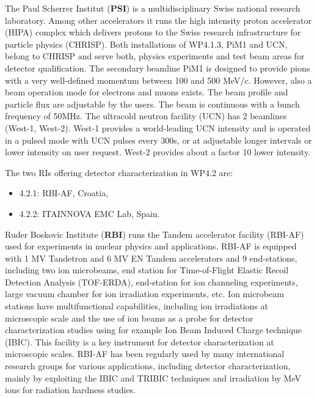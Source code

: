 The Paul Scherrer Institut (\textbf{PSI}) is a multidisciplinary Swiss national research laboratory. Among other accelerators it runs the high intensity proton accelerator (HIPA) complex which delivers protons to the Swiss research infrastructure for particle physics (CHRISP). Both installations of WP4.1.3, PiM1 and UCN, belong to CHRISP and serve both, physics experiments and test beam areas for detector qualification. The secondary beamline PiM1 is designed to provide pions with a very well-defined momentum between 100 and 500 MeV/c. However, also a beam operation mode for electrons and muons exists. The beam profile and particle flux are adjustable by the users. The beam is continuous with a bunch frequency of 50MHz. The ultracold neutron facility (UCN) has 2 beamlines (West-1, West-2). West-1 provides a world-leading UCN intensity and is operated in a pulsed mode with UCN pulses every 300s, or at adjustable longer intervals or lower intensity on user request. West-2 provides about a factor 10 lower intensity. 

The two RIs offering detector characterization in WP4.2 are:
\begin{itemize}
    \item	4.2.1: RBI-AF, Croatia,
    \item	4.2.2: ITAINNOVA EMC Lab, Spain.
\end{itemize}

Ruder Boskovic Institute (\textbf{RBI}) runs the Tandem accelerator facility (RBI-AF) used for experiments in nuclear physics and applications. RBI-AF is equipped with 1 MV Tandetron and 6 MV EN Tandem accelerators and 9 end-stations, including two ion microbeams, end station for Time-of-Flight Elastic Recoil Detection Analysis (TOF-ERDA), end-station for ion channeling experiments, large vacuum chamber for ion irradiation experiments, etc. Ion microbeam stations have multifunctional capabilities, including ion irradiations at microscopic scale and the use of ion beams as a probe for detector characterization studies using for example Ion Beam Induced Charge technique (IBIC). This facility is a key instrument for detector characterization at microscopic scales. RBI-AF has been regularly used by many international research groups for various applications, including detector characterization, mainly by exploiting the IBIC and TRIBIC techniques and irradiation by MeV ions for radiation hardness studies. 

